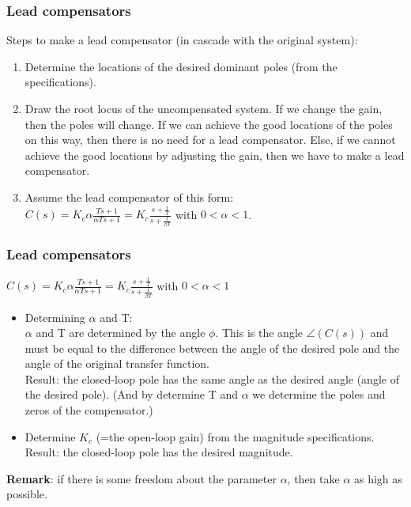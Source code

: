 \begin{frame}
	\frametitle{Lead compensators}
	Steps to make a lead compensator (in cascade with the original system):
	\begin{enumerate}
		\item Determine the locations of the desired dominant poles (from the specifications).
		\item Draw the root locus of the uncompensated system. If we change the gain, then the poles will change. If we can achieve the good locations of the poles on this way, then there is no need for a lead compensator. Else, if we cannot achieve the good locations by adjusting the gain, then we have to make a lead compensator. 
		\item Assume the lead compensator of this form: \\
		$C(s)=K_c \alpha\frac{Ts+1}{\alpha Ts+1}= K_c\frac{s+\frac{1}{T}}{s+\frac{1}{\beta T}}$ with $0<\alpha<1$.
	\end{enumerate}
\end{frame}

\begin{frame}
	\frametitle{Lead compensators}
		$C(s)=K_c \alpha\frac{Ts+1}{\alpha Ts+1}= K_c\frac{s+\frac{1}{T}}{s+\frac{1}{\beta T}}$ with $0<\alpha<1$\\
		\begin{itemize}
			\item Determining $\alpha$ and T:\\
			$\alpha$ and T are determined by the angle $\phi$. This is the angle $\angle(C(s))$ and must be equal to the difference between the angle of the desired pole and the angle of the original transfer function. \\
			Result: the closed-loop pole has the same angle as the desired angle (angle of the desired pole). (And by determine T and $\alpha$ we determine the poles and zeros of the compensator.)
			\item Determine $K_c$ (=the open-loop gain) from the magnitude specifications.\\
			Result: the closed-loop pole has the desired magnitude. 
		\end{itemize}
		\textbf{Remark}: if there is some freedom about the parameter $\alpha$, then take $\alpha$ as high as possible. 
\end{frame}


